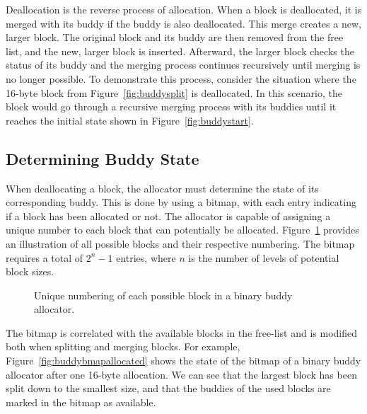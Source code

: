 Deallocation is the reverse process of allocation. When a block is deallocated, it is merged with its buddy if the buddy is also deallocated. This merge creates a new, larger block. The original block and its buddy are then removed from the free list, and the new, larger block is inserted. Afterward, the larger block checks the status of its buddy and the merging process continues recursively until merging is no longer possible. To demonstrate this process, consider the situation where the 16-byte block from Figure~\ref{fig:buddysplit} is deallocated. In this scenario, the block would go through a recursive merging process with its buddies until it reaches the initial state shown in Figure~\ref{fig:buddystart}.

\subsection{Determining Buddy State}
When deallocating a block, the allocator must determine the state of its corresponding buddy. This is done by using a bitmap, with each entry indicating if a block has been allocated or not. The allocator is capable of assigning a unique number to each block that can potentially be allocated. Figure~\ref{fig:buddyorder} provides an illustration of all possible blocks and their respective numbering. The bitmap requires a total of $2^n - 1$ entries, where $n$ is the number of levels of potential block sizes.

\begin{figure}[H]
    \centering
    
    \caption{Unique numbering of each possible block in a binary buddy allocator.}
    \label{fig:buddyorder}
\end{figure}

The bitmap is correlated with the available blocks in the free-list and is modified both when splitting and merging blocks. For example, Figure~\ref{fig:buddybmapallocated} shows the state of the bitmap of a binary buddy allocator after one 16-byte allocation. We can see that the largest block has been split down to the smallest size, and that the buddies of the used blocks are marked in the bitmap as available.


